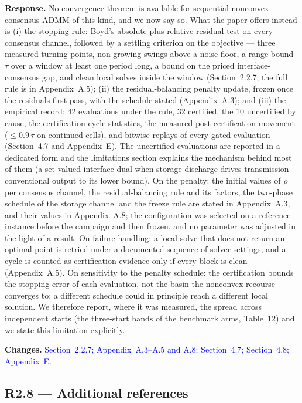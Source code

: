 \documentclass[11pt]{article}
\newcommand{\rresponse}[1]{\noindent\textbf{Response.} #1\par\smallskip}
\newcommand{\rchanges}[1]{\noindent\textbf{Changes.} \textcolor{blue}{#1}\par\medskip}
\begin{document}
\rresponse{No convergence theorem is available for sequential nonconvex consensus ADMM of this kind, and we
now say so. What the paper offers instead is (i) the stopping rule: Boyd's absolute-plus-relative
residual test on every consensus channel, followed by a settling criterion on the objective --- three
measured turning points, non-growing swings above a noise floor, a range bound $\tau$ over a window at
least one period long, a bound on the priced interface-consensus gap, and clean local solves inside the
window (Section~2.2.7; the full rule is in Appendix~A.5); (ii) the residual-balancing penalty update, frozen once the residuals first pass,
with the schedule stated (Appendix~A.3); and (iii) the empirical record: 42 evaluations under the rule, 32
certified, the 10 uncertified by cause, the certification-cycle statistics, the measured
post-certification movement ($\le 0.9\,\tau$ on continued cells), and bitwise replays of every gated
evaluation (Section~4.7 and Appendix~E). The uncertified evaluations are reported in a dedicated form and
the limitations section explains the mechanism behind most of them (a set-valued interface dual when
storage discharge drives transmission conventional output to its lower bound). On the penalty: the
initial values of $\rho$ per consensus channel, the residual-balancing rule and its factors, the two-phase
schedule of the storage channel and the freeze rule are stated in Appendix~A.3, and their values in Appendix~A.8; the configuration was
selected on a reference instance before the campaign and then frozen, and no parameter was adjusted in
the light of a result. On failure handling: a local solve that does not return an optimal point is retried
under a documented sequence of solver settings, and a cycle is counted as certification evidence only if
every block is clean (Appendix~A.5). On sensitivity to the penalty schedule: the certification bounds the
stopping error of each evaluation, not the basin the nonconvex recourse converges to; a different
schedule could in principle reach a different local solution. We therefore report, where it was measured,
the spread across independent starts (the three-start bands of the benchmark arms, Table~12) and we
state this limitation explicitly.}
\rchanges{Section~2.2.7; Appendix~A.3--A.5 and A.8; Section~4.7; Section~4.8; Appendix~E.}

\subsection*{R2.8 --- Additional references}
\end{document}
